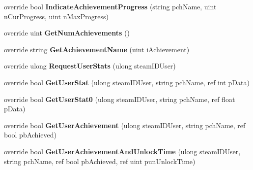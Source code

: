 \begin{DoxyCompactItemize}
override bool {\bfseries Indicate\+Achievement\+Progress} (string pch\+Name, uint n\+Cur\+Progress, uint n\+Max\+Progress)
\item 
\mbox{\label{class_valve_1_1_steamworks_1_1_c_steam_user_stats_a352d75354a9ced4dd2f29044514f5cab}} 
override uint {\bfseries Get\+Num\+Achievements} ()
\item 
\mbox{\label{class_valve_1_1_steamworks_1_1_c_steam_user_stats_a997cb47bee322fa78479bb5604684349}} 
override string {\bfseries Get\+Achievement\+Name} (uint i\+Achievement)
\item 
\mbox{\label{class_valve_1_1_steamworks_1_1_c_steam_user_stats_a6f0833286f48dff64d83b33712ec7613}} 
override ulong {\bfseries Request\+User\+Stats} (ulong steam\+I\+D\+User)
\item 
\mbox{\label{class_valve_1_1_steamworks_1_1_c_steam_user_stats_a93d5586de00e9f71c0750e6c80032019}} 
override bool {\bfseries Get\+User\+Stat} (ulong steam\+I\+D\+User, string pch\+Name, ref int p\+Data)
\item 
\mbox{\label{class_valve_1_1_steamworks_1_1_c_steam_user_stats_a5f850b5891b5432d74424b489c3af939}} 
override bool {\bfseries Get\+User\+Stat0} (ulong steam\+I\+D\+User, string pch\+Name, ref float p\+Data)
\item 
\mbox{\label{class_valve_1_1_steamworks_1_1_c_steam_user_stats_a874f6329d578c9207adf6a24a7deeedb}} 
override bool {\bfseries Get\+User\+Achievement} (ulong steam\+I\+D\+User, string pch\+Name, ref bool pb\+Achieved)
\item 
\mbox{\label{class_valve_1_1_steamworks_1_1_c_steam_user_stats_a5f51cc6ea97d9966ccfd496194db2fb4}} 
override bool {\bfseries Get\+User\+Achievement\+And\+Unlock\+Time} (ulong steam\+I\+D\+User, string pch\+Name, ref bool pb\+Achieved, ref uint pun\+Unlock\+Time)
\item 
\mbox{\label{class_valve_1_1_steamworks_1_1_c_steam_user_stats_a482f752c475972c9a3c5fbe538cecb6d}} 

\end{DoxyCompactItemize}
